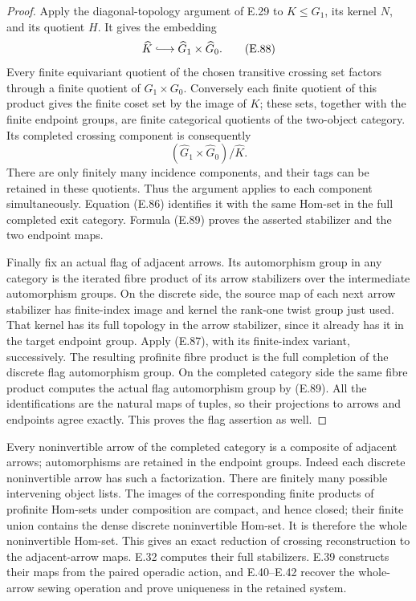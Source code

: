 \begin{proof}
Apply the diagonal-topology argument of E.29 to
$K\leq G_1$, its kernel $N$, and its quotient $H$.
It gives the embedding
\[
          \widehat K\lhook\joinrel\longrightarrow
                    \widehat G_1\times\widehat G_0.           \tag{E.88}
\]
Every finite equivariant quotient of the chosen transitive
crossing set factors through a finite quotient of
$G_1\times G_0$.  Conversely each finite quotient of this
product gives the finite coset set by the image of $K$;
these sets, together with the finite endpoint groups, are
finite categorical quotients of the two-object category.
Its completed crossing component is consequently
\[
       (\widehat G_1\times\widehat G_0)/\widehat K.             \tag{E.89}
\]
There are only finitely many incidence components, and
their tags can be retained in these quotients.  Thus the
argument applies to each component simultaneously.
Equation (E.86) identifies it with the same Hom-set in
the full completed exit category.  Formula (E.89) proves
the asserted stabilizer and the two endpoint maps.

Finally fix an actual flag of adjacent arrows.  Its
automorphism group in any category is the iterated fibre
product of its arrow stabilizers over the intermediate
automorphism groups.  On the discrete side, the source map
of each next arrow stabilizer has finite-index image and
kernel the rank-one twist group just used.  That kernel
has its full topology in the arrow stabilizer, since it
already has it in the target endpoint group.
Apply (E.87), with its finite-index variant, successively.
The resulting profinite fibre product is the full completion
of the discrete flag automorphism group.  On the completed
category side the same fibre product computes the actual
flag automorphism group by (E.89).  All the identifications
are the natural maps of tuples, so their projections to
arrows and endpoints agree exactly.  This proves the flag
assertion as well.
\end{proof}

Every noninvertible arrow of the completed category is a
composite of adjacent arrows; automorphisms are retained in
the endpoint groups.  Indeed each discrete noninvertible arrow has such a
factorization.  There are finitely many possible intervening
object lists.  The images of the corresponding finite
products of profinite Hom-sets under composition are compact,
and hence closed; their finite union contains the dense
discrete noninvertible Hom-set.  It is therefore the whole
noninvertible Hom-set.
This gives an exact reduction of crossing reconstruction
to the adjacent-arrow maps.  E.32 computes their full
stabilizers.  E.39 constructs their maps from the paired
operadic action, and E.40--E.42 recover the whole-arrow
sewing operation and prove uniqueness in the retained system.
